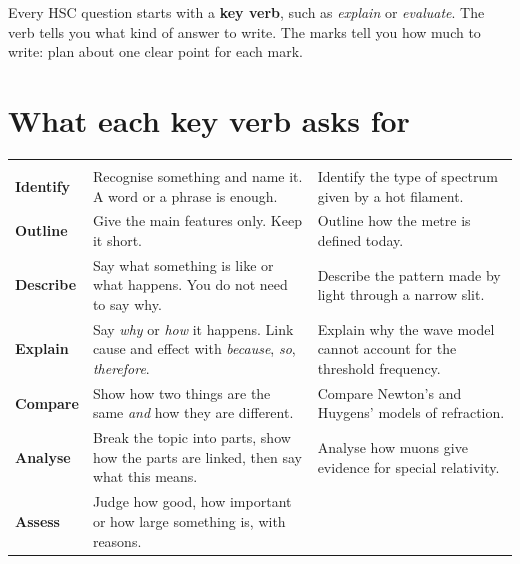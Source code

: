\label{bm:answering}

Every HSC question starts with a \textbf{key verb}, such as \emph{explain} or
\emph{evaluate}. The verb tells you what kind of answer to write. The marks tell you how much
to write: plan about one clear point for each mark.

\section*{What each key verb asks for}

{\small
\renewcommand\arraystretch{1.2}%
\setlength\LTpre{4pt}\setlength\LTpost{4pt}%
\begin{longtable}{@{}L{18mm}@{\hspace{3mm}}L{66mm}@{\hspace{3mm}}L{60mm}@{}}
   &  & \\\hline
  \endfirsthead
   &  & \\\hline
  \endhead
  \textbf{Identify} & Recognise something and name it. A word or a phrase is enough. &
    Identify the type of spectrum given by a hot filament.\\\hline
  \textbf{Outline} & Give the main features only. Keep it short. &
    Outline how the metre is defined today.\\\hline
  \textbf{Describe} & Say what something is like or what happens. You do not need to say why.
    & Describe the pattern made by light through a narrow slit.\\\hline
  \textbf{Explain} & Say \emph{why} or \emph{how} it happens. Link cause and effect with
    \emph{because}, \emph{so}, \emph{therefore}. & Explain why the wave model cannot account
    for the threshold frequency.\\\hline
  \textbf{Compare} & Show how two things are the same \emph{and} how they are different. &
    Compare Newton's and Huygens' models of refraction.\\\hline
  \textbf{Analyse} & Break the topic into parts, show how the parts are linked, then say what
    this means. & Analyse how muons give evidence for special relativity.\\\hline
  \textbf{Assess} & Judge how good, how important or how large something is, with reasons. &

\end{longtable}}
